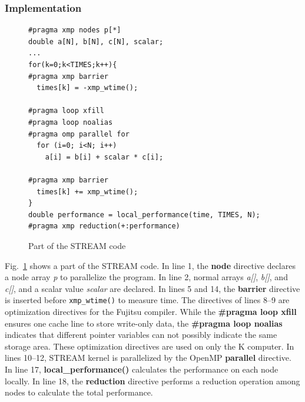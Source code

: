 \documentclass[graybox]{svmult}
\begin{document}
\subsubsection{Implementation}
\begin{figure}[h]
\begin{lstlisting}
#pragma xmp nodes p[*]
double a[N], b[N], c[N], scalar;
...
for(k=0;k<TIMES;k++){
#pragma xmp barrier
  times[k] = -xmp_wtime();

#pragma loop xfill
#pragma loop noalias
#pragma omp parallel for
  for (i=0; i<N; i++)
    a[i] = b[i] + scalar * c[i];

#pragma xmp barrier
  times[k] += xmp_wtime();
}
double performance = local_performance(time, TIMES, N);
#pragma xmp reduction(+:performance)
\end{lstlisting}
\caption{Part of the STREAM code\cite{hpca}}\label{fig:code-stream}
\end{figure}

Fig.~\ref{fig:code-stream} shows a part of the STREAM code.
In line 1,
the {\bf node} directive declares a node array {\it p} to parallelize the program.
In line 2, normal arrays {\it a[]}, {\it b[]}, and {\it c[]}, and a scalar value {\it scalar} are declared.
In lines 5 and 14, the {\bf barrier} directive is inserted before {\tt xmp\_wtime()} to measure time.
The directives of lines 8--9 are optimization directives for the Fujitsu compiler.
While the {\bf \#pragma loop xfill} ensures one cache line to store write-only data,
the {\bf \#pragma loop noalias} indicates that different pointer variables can not possibly indicate the same storage area.
These optimization directives are used on only the K computer.
In lines 10--12, STREAM kernel is parallelized by the OpenMP {\bf parallel} directive.
In line 17, {\bf local\_performance()} calculates the performance on each node locally.
In line 18, the {\bf reduction} directive performs a reduction operation among nodes to calculate the total performance.
\end{document}
